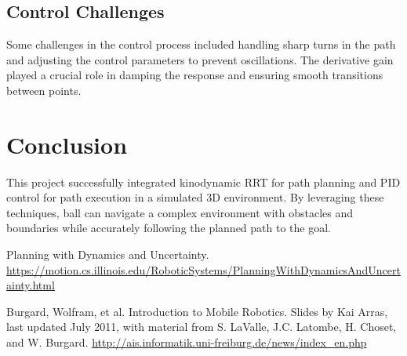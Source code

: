 \documentclass[12pt]{article}
\begin{document}
\subsection{Control Challenges}
Some challenges in the control process included handling sharp turns in the path and adjusting the control parameters to prevent oscillations. The derivative gain played a crucial role in damping the response and ensuring smooth transitions between points.

\section{Conclusion}
This project successfully integrated kinodynamic RRT for path planning and PID control for path execution in a simulated 3D environment. By leveraging these techniques, ball can navigate a complex environment with obstacles and boundaries while accurately following the planned path to the goal.

\begin{thebibliography}{}
\raggedright

Planning with Dynamics and Uncertainty. \href{https://motion.cs.illinois.edu/RoboticSystems/PlanningWithDynamicsAndUncertainty.html}
{https://motion.cs.illinois.edu/RoboticSystems/PlanningWithDynamicsAndUncertainty.html}

Burgard, Wolfram, et al. Introduction to Mobile Robotics. Slides by Kai Arras, last updated July 2011, with material from S. LaValle, J.C. Latombe, H. Choset, and W. Burgard. \href{http://ais.informatik.uni-freiburg.de/news/index_en.php}{http://ais.informatik.uni-freiburg.de/news/index\_en.php}


\end{thebibliography}
\end{document}
